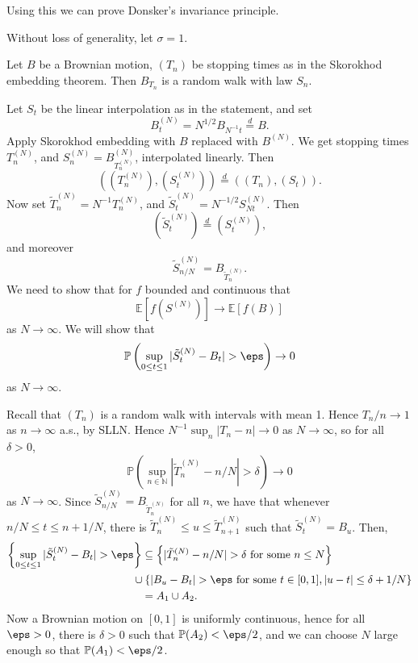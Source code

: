 \documentclass[12pt]{article}
\begin{document}
Using this we can prove Donsker's invariance principle.

\begin{proofbox}
	Without loss of generality, let $\sigma = 1$. 

	Let $B$ be a Brownian motion, $(T_n)$ be stopping times as in the Skorokhod embedding theorem. Then $B_{T_n}$ is a random walk with law $S_n$.

	Let $S_t$ be the linear interpolation as in the statement, and set
	\[
	B_t^{(N)} = N^{1/2} B_{N^{-1} t} \overset d = B.
	\]
	Apply Skorokhod embedding with $B$ replaced with $B^{(N)}$. We get stopping times $T_n^{(N)}$, and $S_n^{(N)} = B_{T_n^{(N)}}^{(N)}$, interpolated linearly. Then
	\[
		((T_n^{(N)}), (S_t^{(N)})) \overset d = ((T_n), (S_t)).
	\]
	Now set $\tilde T_n^{(N)} = N^{-1} T_n^{(N)}$, and $\tilde S_t^{(N)} = N^{-1/2} S_{Nt}^{(N)}$. Then
	\[
		(\tilde S_t^{(N)}) \overset d = (S_t^{(N)}),
	\]
	and moreover
	\[
	\tilde S_{n/N}^{(N)} = B_{\tilde T_n^{(N)}}.
	\]
	We need to show that for $f$ bounded and continuous that
	\[
	\mathbb{E}[f(S^{(N)})] \to \mathbb{E}[f(B)]
	\]
	as $N \to \infty$. We will show that
	\[
	\mathbb{P}\left( \sup_{0 \leq t \leq 1} |\tilde S_t^{(N)} - B_t| > \eps\right) \to 0
	\]
	as $N \to \infty$.

	Recall that $(T_n)$ is a random walk with intervals with mean 1. Hence $T_n/n \to 1$ as $n \to \infty$ a.s., by SLLN. Hence $N^{-1} \sup_n |T_n - n| \to 0$ as $N \to \infty$, so for all $\delta > 0$,
	\[
	\mathbb{P}\left( \sup_{n \in \mathbb{N}} |\tilde T_n^{(N)} - n/N| > \delta \right) \to 0
	\]
	as $N \to \infty$. Since $\tilde S_{n/N}^{(N)} = B_{\tilde T_n^{(N)}}$ for all $n$, we have that whenever $n/N \leq t \leq n+1/N$, there is $\tilde T_n^{(N)} \leq u \leq \tilde T_{n+1}^{(N)}$ such that $\tilde S_t^{(N)} = B_u$. Then,
	\begin{align*}
		\left\{ \sup_{0 \leq t \leq 1} |\tilde S_t^{(N)} - B_t| > \eps \right\} &\subseteq \left\{|\tilde T_n^{(N)} - n/N | > \delta \text{ for some } n \leq N\right\} \\
											& \!\!\!\!\!\cup \{|B_u - B_t| > \eps \text{ for some } t \in [0, 1], |u - t| \leq \delta + 1/N\} \\
											&= A_1 \cup A_2.
	\end{align*}
	Now a Brownian motion on $[0, 1]$ is uniformly continuous, hence for all $\eps > 0$, there is $\delta > 0$ such that $\mathbb{P}(A_2) < \eps/2$, and we can choose $N$ large enough so that $\mathbb{P}(A_1) < \eps/2$.
\end{proofbox}
\end{document}
